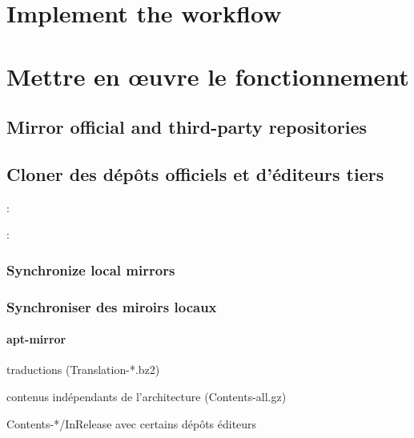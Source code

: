 \ml
{\section{Implement the workflow}}
{\section{Mettre en œuvre le fonctionnement}}

\ml
{\subsection{Mirror official and third-party repositories}}
{\subsection{Cloner des dépôts officiels et d’éditeurs tiers}}

:
\begin{itmz}
\item{\ml{\todo}
{\todo}}
\end{itmz}

:
\begin{itmz}
\item{\ml{\todo}
{\todo}}
\end{itmz}

\ml
{\subsubsection{Synchronize local mirrors}}
{\subsubsection{Synchroniser des miroirs locaux}}

\paragraph{apt-mirror}

\begin{itmz}
\item{
{traductions} (Translation-*.bz2)}
\item{
{contenus indépendants de l’architecture} (Contents-all.gz)}
\item{Contents-*/InRelease 
{avec certains dépôts éditeurs}}
\end{itmz}

